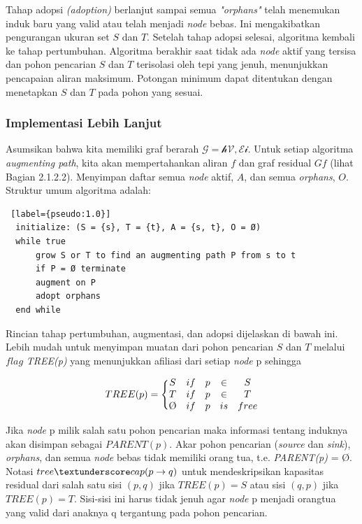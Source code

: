 Tahap adopsi \emph{(adoption)} berlanjut sampai semua \emph{"orphans"} telah menemukan 
induk baru yang valid atau telah menjadi \emph{node} bebas. Ini mengakibatkan pengurangan 
ukuran set \(S\) dan \(T\). Setelah tahap adopsi selesai, algoritma kembali ke tahap 
pertumbuhan. Algoritma berakhir saat tidak ada \emph{node} aktif yang tersisa dan pohon 
pencarian \(S\) dan \(T\) terisolasi oleh tepi yang jenuh, menunjukkan pencapaian 
aliran maksimum. Potongan minimum dapat ditentukan dengan menetapkan \(S\) dan \(T\) 
pada pohon yang sesuai.

\subsubsection{Implementasi Lebih Lanjut} 

Asumsikan bahwa kita memiliki graf berarah \(\mathcal{G = hV, Ei}\). Untuk setiap algoritma 
\emph{augmenting path}, kita akan mempertahankan aliran \(f\) dan graf residual \(Gf\) 
(lihat Bagian 2.1.2.2). Menyimpan daftar semua \emph{node} aktif, \(A\), dan semua \emph{orphans}, \(O\). 
Struktur umum algoritma adalah:

\begin{lstlisting} [label={pseudo:1.0}]
  initialize: (S = {s}, T = {t}, A = {s, t}, O = Ø)
  while true
      grow S or T to find an augmenting path P from s to t
      if P = Ø terminate
      augment on P
      adopt orphans
  end while  
\end{lstlisting}

Rincian tahap pertumbuhan, augmentasi, dan adopsi dijelaskan di bawah ini. Lebih 
mudah untuk menyimpan muatan dari pohon pencarian \(S\) dan \(T\) melalui \(flag\) \emph{TREE(p)} 
yang menunjukkan afiliasi dari setiap \emph{node} p sehingga

\begin{equation} \label{eq:searchtree_awal}
  TREE(p) =  \Biggl\{\begin{matrix}
    S & if & p & \in & S\\
    T & if & p & \in & T\\
    $\O$ & if & p & is & free
    \end{matrix}
\end{equation}

Jika \emph{node} p milik salah satu pohon pencarian maka informasi tentang induknya 
akan disimpan sebagai \(PARENT(p)\). Akar pohon pencarian (\emph{source} dan \emph{sink}), 
\emph{orphans}, dan semua \emph{node} bebas tidak memiliki orang tua, 
t.e. \emph{PARENT(p)} = Ø. Notasi \(tree\textunderscore cap(p \rightarrow q)\) 
untuk mendeskripsikan kapasitas residual dari salah satu sisi \((p, q)\) jika \(TREE(p) = S\) 
atau sisi \((q, p)\) jika \(TREE(p) = T\). Sisi-sisi ini harus tidak jenuh agar 
\emph{node} p menjadi orangtua yang valid dari anaknya q tergantung pada pohon pencarian.

